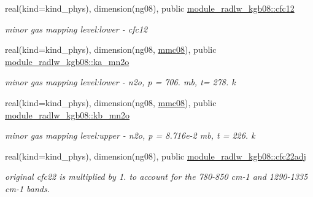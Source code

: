 \begin{DoxyCompactItemize}
real(kind=kind\+\_\+phys), dimension(ng08), public \hyperlink{group__module__radlw__kgbnn_ga010239f14788bc1ed9953133e30a62fd}{module\+\_\+radlw\+\_\+kgb08\+::cfc12}
\begin{DoxyCompactList}\small\item\em minor gas mapping level\+:lower -\/ cfc12 \end{DoxyCompactList}\item 
\mbox{\label{group__module__radlw__kgbnn_ga61949dc331e9a58d4f2a31b625481795}} 
real(kind=kind\+\_\+phys), dimension(ng08, \hyperlink{group__module__radlw__kgbnn_ga9e3bfc1880221c18fa07817eb62bcc47}{mmc08}), public \hyperlink{group__module__radlw__kgbnn_ga61949dc331e9a58d4f2a31b625481795}{module\+\_\+radlw\+\_\+kgb08\+::ka\+\_\+mn2o}
\begin{DoxyCompactList}\small\item\em minor gas mapping level\+:lower -\/ n2o, p = 706. mb, t= 278. k \end{DoxyCompactList}\item 
\mbox{\label{group__module__radlw__kgbnn_ga9a8e2f789421acc307e37b03478efb4b}} 
real(kind=kind\+\_\+phys), dimension(ng08, \hyperlink{group__module__radlw__kgbnn_ga9e3bfc1880221c18fa07817eb62bcc47}{mmc08}), public \hyperlink{group__module__radlw__kgbnn_ga9a8e2f789421acc307e37b03478efb4b}{module\+\_\+radlw\+\_\+kgb08\+::kb\+\_\+mn2o}
\begin{DoxyCompactList}\small\item\em minor gas mapping level\+:upper -\/ n2o, p = 8.\+716e-\/2 mb, t = 226. k \end{DoxyCompactList}\item 
\mbox{\label{group__module__radlw__kgbnn_ga38a3ce7d8f3db6b732511cf78ef735db}} 
real(kind=kind\+\_\+phys), dimension(ng08), public \hyperlink{group__module__radlw__kgbnn_ga38a3ce7d8f3db6b732511cf78ef735db}{module\+\_\+radlw\+\_\+kgb08\+::cfc22adj}
\begin{DoxyCompactList}\small\item\em original cfc22 is multiplied by 1. to account for the 780-\/850 cm-\/1 and 1290-\/1335 cm-\/1 bands. \end{DoxyCompactList}\item 
\mbox{\label{group__module__radlw__kgbnn_ga7e6bb7acb0df29586d0bd52f3fc41d90}} 

\end{DoxyCompactItemize}
